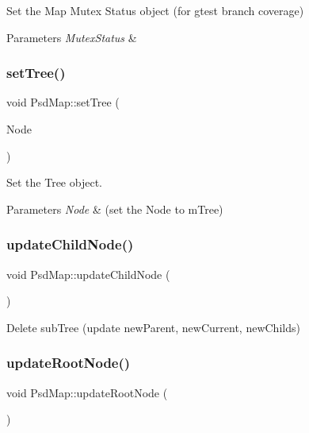 Set the Map Mutex Status object (for gtest branch coverage) 


\begin{DoxyParams}{Parameters}
{\em Mutex\+Status} & \\
\hline
\end{DoxyParams}
\mbox{\label{class_psd_map_a56643c65f1e5d4af827259354572d57a}} 
\subsubsection{\texorpdfstring{set\+Tree()}{setTree()}}
{\footnotesize\ttfamily void Psd\+Map\+::set\+Tree (\begin{DoxyParamCaption}\item[{struct \hyperlink{struct_tree_node}{Tree\+Node} $\ast$}]{Node }\end{DoxyParamCaption})}



Set the Tree object. 


\begin{DoxyParams}{Parameters}
{\em Node} & (set the Node to m\+Tree) \\
\hline
\end{DoxyParams}
\mbox{\label{class_psd_map_a3129a5bf0d09334c47ee35a291ee688c}} 
\subsubsection{\texorpdfstring{update\+Child\+Node()}{updateChildNode()}}
{\footnotesize\ttfamily void Psd\+Map\+::update\+Child\+Node (\begin{DoxyParamCaption}{ }\end{DoxyParamCaption})}



Delete sub\+Tree (update new\+Parent, new\+Current, new\+Childs) 

\mbox{\label{class_psd_map_ade677b7a2b308a4c5ce99f343ddc56ff}} 
\subsubsection{\texorpdfstring{update\+Root\+Node()}{updateRootNode()}}
{\footnotesize\ttfamily void Psd\+Map\+::update\+Root\+Node (\begin{DoxyParamCaption}{ }\end{DoxyParamCaption})}



